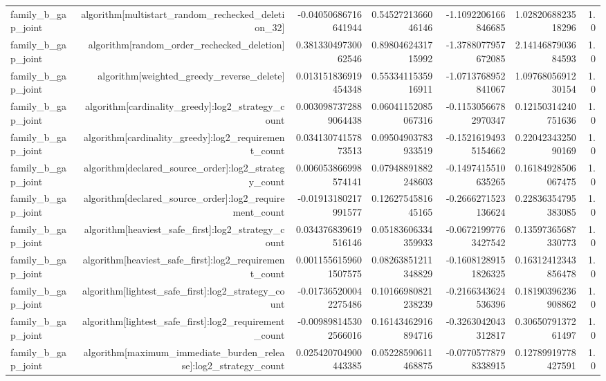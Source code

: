 {\begin{longtable}{lrrrrrr}
family\_b\_gap\_joint & algorithm[multistart\_random\_rechecked\_deletion\_32] & -0.04050686716641944 & 0.5452721366046146 & -1.1092206166846685 & 1.0282068823518296 & 1.0 \\
family\_b\_gap\_joint & algorithm[random\_order\_rechecked\_deletion] & 0.38133049730062546 & 0.8980462431715992 & -1.3788077957672085 & 2.1414687903684593 & 1.0 \\
family\_b\_gap\_joint & algorithm[weighted\_greedy\_reverse\_delete] & 0.013151836919454348 & 0.5533411535916911 & -1.0713768952841067 & 1.0976805691230154 & 1.0 \\
family\_b\_gap\_joint & algorithm[cardinality\_greedy]:log2\_strategy\_count & 0.0030987372889064438 & 0.06041152085067316 & -0.11530566782970347 & 0.12150314240751636 & 1.0 \\
family\_b\_gap\_joint & algorithm[cardinality\_greedy]:log2\_requirement\_count & 0.03413074157873513 & 0.09504903783933519 & -0.15216194935154662 & 0.2204234325090169 & 1.0 \\
family\_b\_gap\_joint & algorithm[declared\_source\_order]:log2\_strategy\_count & 0.006053866998574141 & 0.07948891882248603 & -0.1497415510635265 & 0.16184928506067475 & 1.0 \\
family\_b\_gap\_joint & algorithm[declared\_source\_order]:log2\_requirement\_count & -0.01913180217991577 & 0.1262754581645165 & -0.2666271523136624 & 0.22836354795383085 & 1.0 \\
family\_b\_gap\_joint & algorithm[heaviest\_safe\_first]:log2\_strategy\_count & 0.034376839619516146 & 0.05183606334359933 & -0.06721997763427542 & 0.13597365687330773 & 1.0 \\
family\_b\_gap\_joint & algorithm[heaviest\_safe\_first]:log2\_requirement\_count & 0.0011556159601507575 & 0.08263851211348829 & -0.16081289151826325 & 0.16312412343856478 & 1.0 \\
family\_b\_gap\_joint & algorithm[lightest\_safe\_first]:log2\_strategy\_count & -0.017365200042275486 & 0.10166980821238239 & -0.2166343624536396 & 0.18190396236908862 & 1.0 \\
family\_b\_gap\_joint & algorithm[lightest\_safe\_first]:log2\_requirement\_count & -0.009898145302566016 & 0.16143462916894716 & -0.3263042043312817 & 0.3065079137261497 & 1.0 \\
family\_b\_gap\_joint & algorithm[maximum\_immediate\_burden\_release]:log2\_strategy\_count & 0.025420704900443385 & 0.05228590611468875 & -0.07705778798338915 & 0.12789919778427591 & 1.0 \\

\end{longtable}}
